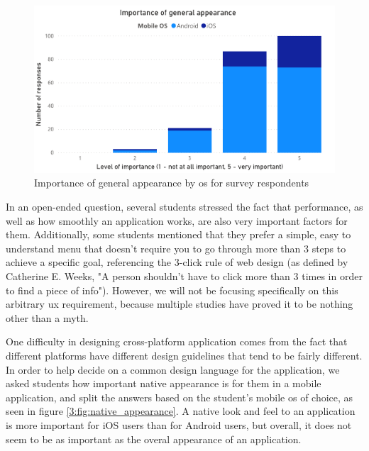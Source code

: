 \begin{figure}[ht]
    \centering
         \includegraphics[width=\textwidth]{figures/charts/survey/appearance.pdf}
    \caption{Importance of general appearance by \acrshort{os} for survey respondents}
    \label{3:fig:appearance}
\end{figure}

In an open-ended question, several students stressed the fact that performance, as well as how smoothly an application works, are also very important factors for them. Additionally, some students mentioned that they prefer a simple, easy to understand menu that doesn't require you to go through more than 3 steps to achieve a specific goal, referencing the 3-click rule of web design (as defined by Catherine E. Weeks\cite{weeks1997design}, "A person shouldn’t have to click more than 3 times in order to find a piece of info"). However, we will not be focusing specifically on this arbitrary \acrshort{ux} requirement, because multiple studies\cite{porter2003testing}\cite{nielsen2006prioritizing} have proved it to be nothing other than a myth.

One difficulty in designing cross-platform application comes from the fact that different platforms have different design guidelines that tend to be fairly different\cite{thirumala2017interaction}. In order to help decide on a common design language for the application, we asked students how important native appearance is for them in a mobile application, and split the answers based on the student's mobile \acrshort{os} of choice, as seen in figure \ref{3:fig:native_appearance}. A native look and feel to an application is more important for iOS users than for Android users, but overall, it does not seem to be as important as the overal appearance of an application.

